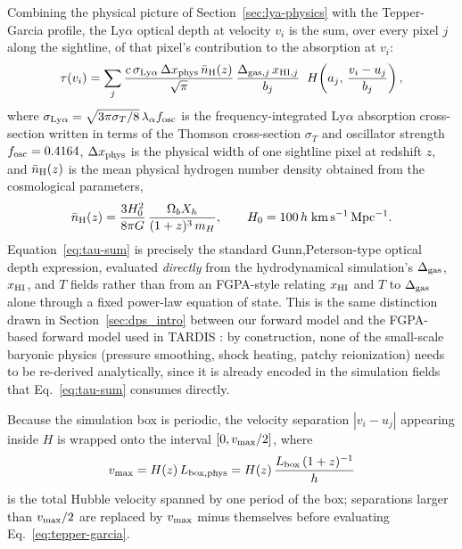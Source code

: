Combining the physical picture of Section~\ref{sec:lya-physics} with the Tepper-Garcia profile, the Ly$\alpha$ optical depth at velocity $v_i$ is the sum, over every pixel $j$ along the sightline, of that pixel's contribution to the absorption at $v_i$:
\begin{equation}
\tau(v_i) = \sum_j \frac{c\,\sigma_{\rm Ly\alpha}\,\Delta x_{\rm phys}\,\bar n_{\rm H}(z)}{\sqrt{\pi}}\,\frac{\Delta_{{\rm gas},j}\,x_{{\rm HI},j}}{b_j}\;\; H\!\left(a_j,\,\frac{v_i-u_j}{b_j}\right),
\label{eq:tau-sum}
\end{equation}
where $\sigma_{\rm Ly\alpha}=\sqrt{3\pi\sigma_T/8}\,\lambda_\alpha f_{\rm osc}$ is the frequency-integrated Ly$\alpha$ absorption cross-section written in terms of the Thomson cross-section $\sigma_T$ and oscillator strength $f_{\rm osc}=0.4164$, $\Delta x_{\rm phys}$ is the physical width of one sightline pixel at redshift $z$, and $\bar n_{\rm H}(z)$ is the mean physical hydrogen number density obtained from the cosmological parameters,
\begin{equation}
\bar n_{\rm H}(z) = \frac{3H_0^2}{8\pi G}\,\frac{\Omega_b X_h}{(1+z)^3\,m_H}, \qquad H_0 = 100\,h\;{\rm km\,s^{-1}\,Mpc^{-1}}.
\label{eq:mean-nH}
\end{equation}
Equation~\ref{eq:tau-sum} is precisely the standard Gunn,Peterson-type optical depth expression, evaluated \emph{directly} from the hydrodynamical simulation's $\Delta_{\rm gas}$, $x_{\rm HI}$, and $T$ fields rather than from an FGPA-style  relating $x_{\rm HI}$ and $T$ to $\Delta_{\rm gas}$ alone through a fixed power-law equation of state. This is the same distinction drawn in Section~\ref{sec:dps_intro} between our forward model and the FGPA-based forward model used in TARDIS \citep{horowitz_2019}: by construction, none of the small-scale baryonic physics (pressure smoothing, shock heating, patchy reionization) needs to be re-derived analytically, since it is already encoded in the simulation fields that Eq.~\ref{eq:tau-sum} consumes directly.

Because the simulation box is periodic, the velocity separation $|v_i-u_j|$ appearing inside $H$ is wrapped onto the interval $[0,v_{\rm max}/2]$, where
\begin{equation}
v_{\rm max} = H(z)\,L_{\rm box,phys} = H(z)\,\frac{L_{\rm box}\,(1+z)^{-1}}{h}
\label{eq:vmax}
\end{equation}
is the total Hubble velocity spanned by one period of the box; separations larger than $v_{\rm max}/2$ are replaced by $v_{\rm max}$ minus themselves before evaluating Eq.~\ref{eq:tepper-garcia}.

